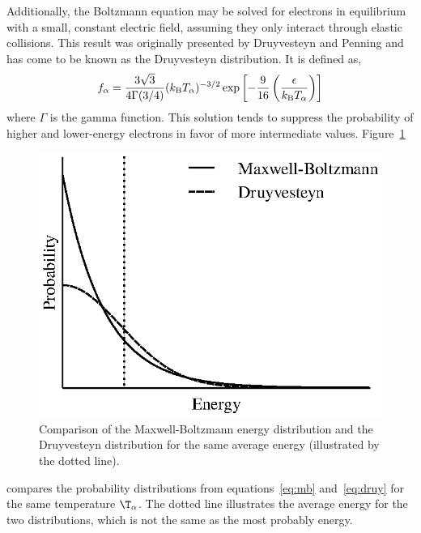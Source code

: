 Additionally, the Boltzmann equation may be solved for electrons in equilibrium
with a small, constant electric field, assuming they only interact through
elastic collisions. This result was originally presented by Druyvesteyn and
Penning \cite{Druyvesteyn1940} and has come to be known as the Druyvesteyn
distribution. It is defined as,
\begin{equation}
  f_{\alpha} = \frac{3\sqrt{3}}{4\Gamma(3/4)}(k_\mathrm{B} T_\alpha)^{-3/2}
  \exp{\left[-\frac{9}{16}\left(\frac{\epsilon}{k_\mathrm{B}T_\alpha}\right)\right]}
  \label{eq:druy}
\end{equation}
where $\Gamma$ is the gamma function. This solution tends to suppress the
probability of higher and lower-energy electrons in favor of more intermediate
values. Figure~\ref{fig:simpledists}
\begin{figure}
  \centering
  \includegraphics{./chapters/theory/figures/simpledists.eps}
  \caption{Comparison of the Maxwell-Boltzmann energy distribution and the
    Druyvesteyn distribution for the same average energy (illustrated by the
  dotted line).}
  \label{fig:simpledists}
\end{figure}
compares the probability distributions from equations~\ref{eq:mb}
and~\ref{eq:druy} for the same temperature $\T_\alpha$. The dotted line
illustrates the average energy for the two distributions, which is not the same
as the most probably energy.

